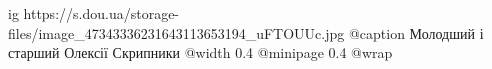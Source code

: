  
 
 
 
 

\ifcmt
  ig https://s.dou.ua/storage-files/image_47343336231643113653194_uFTOUUc.jpg
  @caption Молодший і старший Олексії Скрипники
  @width 0.4
  @minipage 0.4
  @wrap \parpic[r]
\fi
